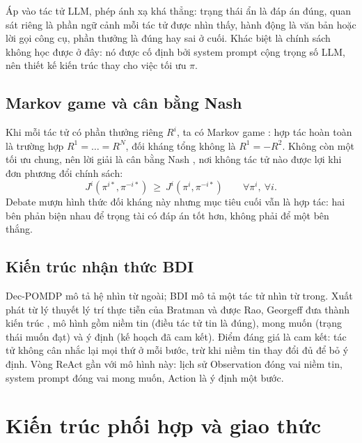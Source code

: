 Áp vào tác tử LLM, phép ánh xạ khá thẳng: trạng thái ẩn là đáp án đúng, quan sát riêng là phần ngữ cảnh mỗi tác tử được nhìn thấy, hành động là văn bản hoặc lời gọi công cụ, phần thưởng là đúng hay sai ở cuối. Khác biệt là chính sách không học được ở đây: nó được cố định bởi system prompt cộng trọng số LLM, nên thiết kế kiến trúc thay cho việc tối ưu $\pi$.

\subsection{Markov game và cân bằng Nash}
Khi mỗi tác tử có phần thưởng riêng $R^i$, ta có Markov game \cite{ch6littman1994}: hợp tác hoàn toàn là trường hợp $R^1=\dots=R^N$, đối kháng tổng không là $R^1=-R^2$. Không còn một tối ưu chung, nên lời giải là cân bằng Nash \cite{ch6nash1951}, nơi không tác tử nào được lợi khi đơn phương đổi chính sách:
\begin{equation}
J^i(\pi^{i*},\pi^{-i*})\ \ge\ J^i(\pi^{i},\pi^{-i*})\qquad \forall \pi^i,\ \forall i .
\end{equation}
Debate mượn hình thức đối kháng này nhưng mục tiêu cuối vẫn là hợp tác: hai bên phản biện nhau để trọng tài có đáp án tốt hơn, không phải để một bên thắng.

\subsection{Kiến trúc nhận thức BDI}
Dec-POMDP mô tả hệ nhìn từ ngoài; BDI mô tả một tác tử nhìn từ trong. Xuất phát từ lý thuyết lý trí thực tiễn của Bratman \cite{ch6bratman1987} và được Rao, Georgeff đưa thành kiến trúc \cite{ch6rao1995}, mô hình gồm niềm tin (điều tác tử tin là đúng), mong muốn (trạng thái muốn đạt) và ý định (kế hoạch đã cam kết). Điểm đáng giá là cam kết: tác tử không cân nhắc lại mọi thứ ở mỗi bước, trừ khi niềm tin thay đổi đủ để bỏ ý định. Vòng ReAct \cite{ch6yao2023} gần với mô hình này: lịch sử Observation đóng vai niềm tin, system prompt đóng vai mong muốn, Action là ý định một bước.


\section{Kiến trúc phối hợp và giao thức}\label{sec:ch6-topo}

